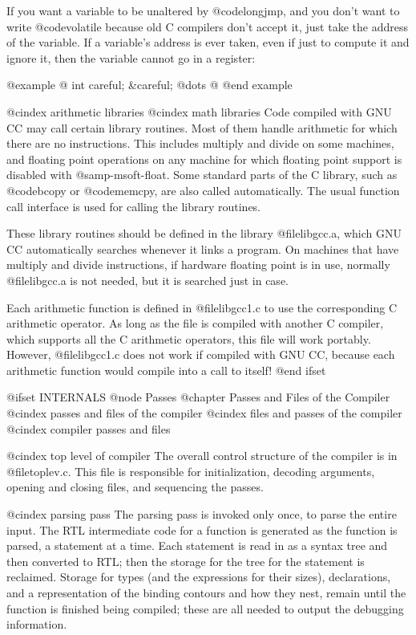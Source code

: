 If you want a variable to be unaltered by @code{longjmp}, and you don't
want to write @code{volatile} because old C compilers don't accept it,
just take the address of the variable.  If a variable's address is ever
taken, even if just to compute it and ignore it, then the variable cannot
go in a register:

@example
@{
  int careful;
  &careful;
  @dots{}
@}
@end example

@cindex arithmetic libraries
@cindex math libraries
Code compiled with GNU CC may call certain library routines.  Most of
them handle arithmetic for which there are no instructions.  This
includes multiply and divide on some machines, and floating point
operations on any machine for which floating point support is disabled
with @samp{-msoft-float}.  Some standard parts of the C library, such as
@code{bcopy} or @code{memcpy}, are also called automatically.  The usual
function call interface is used for calling the library routines.

These library routines should be defined in the library @file{libgcc.a},
which GNU CC automatically searches whenever it links a program.  On
machines that have multiply and divide instructions, if hardware
floating point is in use, normally @file{libgcc.a} is not needed, but it
is searched just in case.

Each arithmetic function is defined in @file{libgcc1.c} to use the
corresponding C arithmetic operator.  As long as the file is compiled
with another C compiler, which supports all the C arithmetic operators,
this file will work portably.  However, @file{libgcc1.c} does not work if
compiled with GNU CC, because each arithmetic function would compile
into a call to itself!
@end ifset

@ifset INTERNALS
@node Passes
@chapter Passes and Files of the Compiler
@cindex passes and files of the compiler
@cindex files and passes of the compiler
@cindex compiler passes and files

@cindex top level of compiler
The overall control structure of the compiler is in @file{toplev.c}.  This
file is responsible for initialization, decoding arguments, opening and
closing files, and sequencing the passes.

@cindex parsing pass
The parsing pass is invoked only once, to parse the entire input.  The RTL
intermediate code for a function is generated as the function is parsed, a
statement at a time.  Each statement is read in as a syntax tree and then
converted to RTL; then the storage for the tree for the statement is
reclaimed.  Storage for types (and the expressions for their sizes),
declarations, and a representation of the binding contours and how they nest,
remain until the function is finished being compiled; these are all needed
to output the debugging information.

